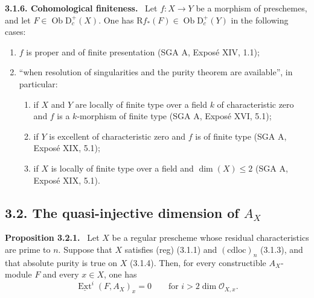 \documentclass[12pt]{article}
\newcommand{\Ext}{\operatorname{Ext}}
\newcommand{\ob}{\operatorname{Ob}}
\newcommand{\D}{\mathrm D}
\newcommand{\R}{\mathrm R}
\newcommand{\cO}{\mathcal O}
\newcommand{\uExt}{\underline{\Ext}}
\newenvironment{statement}[1]{\par\medskip\noindent\textbf{#1.}\ }{\par\medskip}
\begin{document}
\begin{statement}{3.1.6. Cohomological finiteness}
Let $f:X\to Y$ be a morphism of preschemes, and let $F\in\ob\D_c^+(X)$. One has $\R f_*(F)\in\ob\D_c^+(Y)$ in the following cases:
\begin{enumerate}[label=\alph*)]
\item $f$ is proper and of finite presentation (SGA A, Exposé XIV, 1.1);
\item ``when resolution of singularities and the purity theorem are available'', in particular:
\begin{enumerate}[label=(\roman*)]
\item if $X$ and $Y$ are locally of finite type over a field $k$ of characteristic zero and $f$ is a $k$-morphism of finite type (SGA A, Exposé XVI, 5.1);
\item if $Y$ is excellent of characteristic zero and $f$ is of finite type (SGA A, Exposé XIX, 5.1);
\item if $X$ is locally of finite type over a field and $\dim(X)\le2$ (SGA A, Exposé XIX, 5.1).
\end{enumerate}
\end{enumerate}
\end{statement}

\subsection*{3.2. The quasi-injective dimension of $A_X$}

\begin{statement}{Proposition 3.2.1}
Let $X$ be a regular prescheme whose residual characteristics are prime to $n$. Suppose that $X$ satisfies (reg) (3.1.1) and $(\mathrm{cdloc})_n$ (3.1.3), and that absolute purity is true on $X$ (3.1.4). Then, for every constructible $A_X$-module $F$ and every $x\in X$, one has
\[
   \uExt^i(F,A_X)_x=0\qquad\text{for } i>2\dim\cO_{X,x}.\tag{*}
\]
\end{statement}
\end{document}
